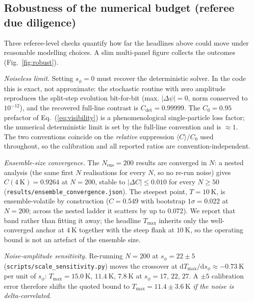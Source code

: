 \documentclass[11pt,a4paper]{article}
\begin{document}
\subsection*{Robustness of the numerical budget (referee due diligence)}
\label{sec:robust}

Three referee-level checks quantify how far the headlines above could move
under reasonable modelling choices. A slim multi-panel figure collects the
outcomes (Fig.~\ref{fig:robust}).

\emph{Noiseless limit.} Setting $s_\phi=0$ must recover the deterministic
solver. In the code this is exact, not approximate: the stochastic routine
with zero amplitude reproduces the split-step evolution bit-for-bit (max.
$|\Delta\psi|=0$, norm conserved to $10^{-12}$), and the recovered
full-line contrast is $C_{\mathrm{det}}=0.99999$. The $C_0=0.95$
prefactor of Eq.~(\ref{eq:visibility}) is a phenomenological single-particle
loss factor; the numerical deterministic limit is set by the full-line
convention and is $\approx1$. The two conventions coincide on the
\emph{relative} suppression $\langle C\rangle/C_0$ used throughout, so the
calibration and all reported ratios are convention-independent.

\emph{Ensemble-size convergence.} The $N_{\text{ens}}=200$ results are
converged in $N$: a nested analysis (the same first $N$ realisations for
every $N$, so no re-run noise) gives $C(4~\mathrm{K})=0.9264$ at $N=200$,
stable to $|\Delta C|\le0.010$ for every $N\ge50$
(\texttt{results/ensemble\_convergence.json}). The steepest point,
$T=10~\mathrm{K}$, is ensemble-volatile by construction ($C=0.549$ with
bootstrap $1\sigma=0.022$ at $N=200$; across the nested ladder it scatters
by up to $0.072$). We report that band rather than fitting it away; the
headline $T_{\max}$ inherits only the well-converged anchor at $4~\mathrm{K}$
together with the steep flank at $10~\mathrm{K}$, so the operating bound is
not an artefact of the ensemble size.

\emph{Noise-amplitude sensitivity.} Re-running $N=200$ at $s_\phi=22\pm5$
(\texttt{scripts/scale\_sensitivity.py}) moves the crossover at
$\mathrm{d}T_{\max}/\mathrm{d}s_\phi\approx-0.73~\mathrm{K}$ per unit of
$s_\phi$: $T_{\max}=15.0~\mathrm{K}$, $11.4~\mathrm{K}$,
$7.8~\mathrm{K}$ at $s_\phi=17$, $22$, $27$. A $\pm5$ calibration error
therefore shifts the quoted bound to
$T_{\max}=11.4\pm3.6~\mathrm{K}$ \emph{if the noise is delta-correlated}.
\end{document}
